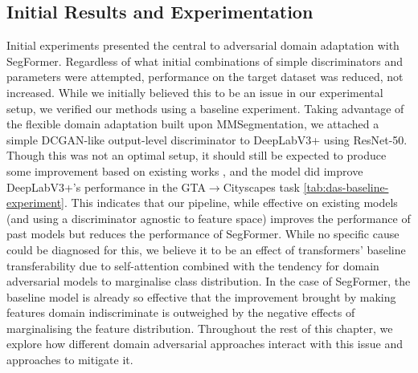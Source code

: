 \documentclass[a4paper,12pt]{report}
\begin{document}
\subsection{Initial Results and Experimentation}
Initial experiments presented the central to adversarial domain adaptation with SegFormer. Regardless of what initial combinations of simple discriminators and parameters were attempted, performance on the target dataset was reduced, not increased. While we initially believed this to be an issue in our experimental setup, we verified our methods using a baseline experiment. Taking advantage of the flexible domain adaptation built upon MMSegmentation, we attached a simple DCGAN-like output-level discriminator to DeepLabV3+ using ResNet-50. Though this was not an optimal setup, it should still be expected to produce some improvement based on existing works \cite{tsai_learning_2020}, and the model did improve DeepLabV3+'s performance in the GTA$\rightarrow$Cityscapes task \ref{tab:das-baseline-experiment}. This indicates that our pipeline, while effective on existing models (and using a discriminator agnostic to feature space) improves the performance of past models but reduces the performance of SegFormer. While no specific cause could be diagnosed for this, we believe it to be an effect of transformers' baseline transferability due to self-attention \cite{dosovitskiy_image_2021} combined with the tendency for domain adversarial models to marginalise class distribution. In the case of SegFormer, the baseline model is already so effective that the improvement brought by making features domain indiscriminate is outweighed by the negative effects of marginalising the feature distribution. Throughout the rest of this chapter, we explore how different domain adversarial approaches interact with this issue and approaches to mitigate it.

\begin{table}[]
    \caption{Baseline experiment results comparing SegFormer and DeeplabV3+. Both experiments used a simplified DCGAN-like [TODO CITE DCGAN] discriminator consisting of 3 convolutional layers with 64, 128, and 2 channels respectively.}
    \label{tab:das-baseline-experiment}
\end{table}
\end{document}

